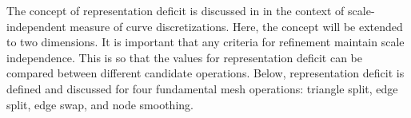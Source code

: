 The concept of representation deficit is discussed in \cite{mclaurin13}
in the context of scale-independent measure of curve discretizations.
Here, the concept will be extended to two dimensions. It is important
that any criteria for refinement maintain scale independence. This is so
that the values for representation deficit can be compared between
different candidate operations. Below, representation deficit is defined
and discussed for four fundamental mesh operations: triangle split, edge
split, edge swap, and node smoothing.
